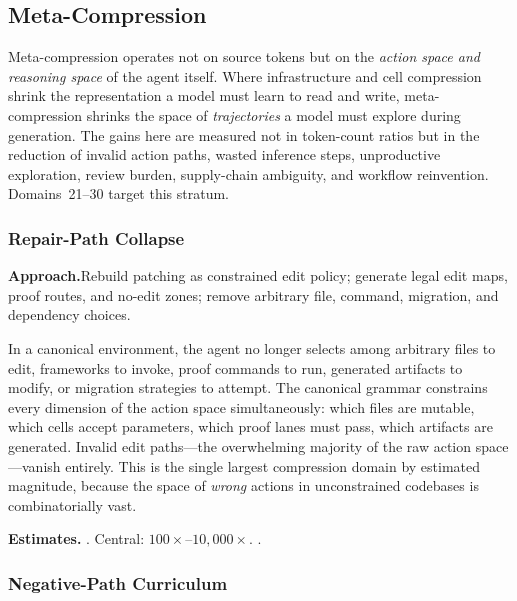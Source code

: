 
\subsection{Meta-Compression}

Meta-compression operates not on source tokens but on the
\emph{action space and reasoning space} of the agent itself.  Where infrastructure and cell
compression shrink the representation a model must learn to read and
write, meta-compression shrinks the space of \emph{trajectories} a model
must explore during generation.  The gains here are measured not in
token-count ratios but in the reduction of invalid action paths, wasted
inference steps, unproductive exploration, review burden, supply-chain
ambiguity, and workflow reinvention.  Domains~21--30 target
this stratum.

\subsubsection{Repair-Path Collapse}
\label{ssec:repair-path}

\smallskip\noindent
\textbf{Approach.}\quad Rebuild patching as constrained edit policy; generate legal edit maps, proof routes, and no-edit zones; remove arbitrary file, command, migration, and dependency choices.

In a canonical environment, the agent no longer selects among arbitrary
files to edit, frameworks to invoke, proof commands to run, generated
artifacts to modify, or migration strategies to attempt.  The canonical
grammar constrains every dimension of the action space simultaneously:
which files are mutable, which cells accept parameters, which proof
lanes must pass, which artifacts are generated.  Invalid edit
paths---the overwhelming majority of the raw action space---vanish
entirely.  This is the single largest compression domain by
estimated magnitude, because the space of \emph{wrong} actions in
unconstrained codebases is combinatorially vast.

\smallskip\noindent
\textbf{Estimates.}\quad
{}.\quad
Central: $100\times$--$10{,}000\times$.\quad
{}.

\subsubsection{Negative-Path Curriculum}
\label{ssec:negative-path}

